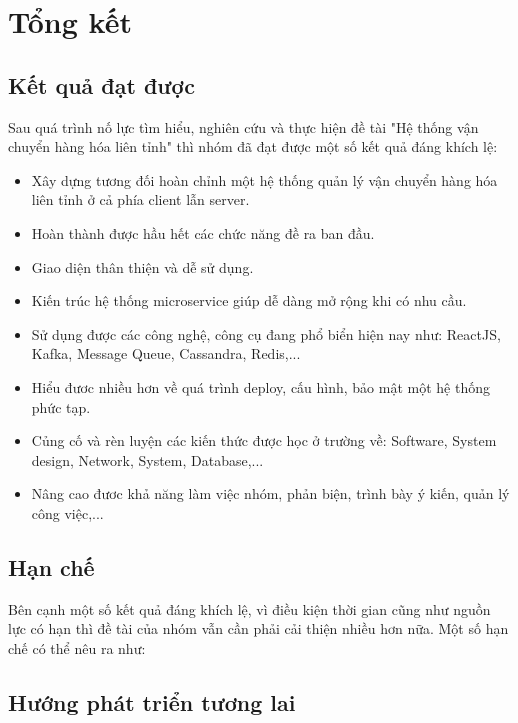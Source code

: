 \chapter{Tổng kết}\label{chap:result}
	\section{Kết quả đạt được}
	Sau quá trình nố lực tìm hiểu, nghiên cứu và thực hiện đề tài "Hệ thống vận chuyển hàng hóa liên tỉnh" thì nhóm đã đạt được một số kết quả đáng khích lệ:
	
	\begin{itemize}
		\item Xây dựng tương đối hoàn chỉnh một hệ thống quản lý vận chuyển hàng hóa liên tỉnh ở cả phía client lẫn server.
		\item Hoàn thành được hầu hết các chức năng đề ra ban đầu.
		\item Giao diện thân thiện và dễ sử dụng.
		\item Kiến trúc hệ thống microservice giúp dễ dàng mở rộng khi có nhu cầu.
		\item Sử dụng được các công nghệ, công cụ đang phổ biển hiện nay như: ReactJS, Kafka, Message Queue, Cassandra, Redis,... 
		\item Hiểu đươc nhiều hơn về quá trình deploy, cấu hình, bảo mật một hệ thống phức tạp.
		\item Củng cố và rèn luyện các kiến thức được học ở trường về: Software, System design, Network, System, Database,...
		\item Nâng cao đươc khả năng làm việc nhóm, phản biện, trình bày ý kiến, quản lý công việc,...
	\end{itemize} 
	
	
	\section{Hạn chế}
	
	Bên cạnh một số kết quả đáng khích lệ, vì điều kiện thời gian cũng như nguồn lực có hạn thì đề tài của nhóm vẫn cần phải cải thiện nhiều hơn nữa. Một số hạn chế có thể nêu ra như:
	

	
	
	\section{Hướng phát triển tương lai}